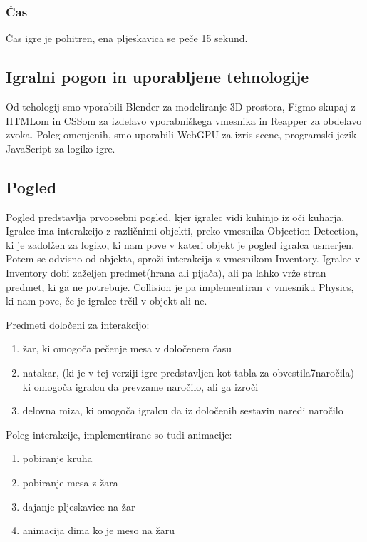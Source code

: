 \documentclass[a4paper]{article}
\begin{document}
\subsubsection{Čas}
Čas igre je pohitren, ena pljeskavica se peče 15 sekund.

\subsection{Igralni pogon in uporabljene tehnologije}
Od tehologij smo vporabili Blender za modeliranje 3D prostora, Figmo skupaj z HTMLom in CSSom za izdelavo vporabniškega vmesnika in Reapper za obdelavo zvoka.
Poleg omenjenih, smo uporabili WebGPU za izris scene, programski jezik JavaScript za logiko igre.

\subsection{Pogled}
Pogled predstavlja prvoosebni pogled, kjer igralec vidi kuhinjo iz oči kuharja. Igralec ima interakcijo z različnimi objekti, preko vmesnika Objection Detection, ki je zadolžen za logiko, ki nam pove v kateri objekt je pogled igralca usmerjen.
Potem se odvisno od objekta, sproži interakcija z vmesnikom Inventory. Igralec v Inventory dobi zaželjen predmet(hrana ali pijača), ali pa lahko vrže stran predmet, ki ga ne potrebuje.
Collision je pa implementiran v vmesniku Physics, ki nam pove, če je igralec trčil v objekt ali ne.

Predmeti določeni za interakcijo: 
\begin{enumerate}
\item žar, ki omogoča pečenje mesa v določenem času
\item natakar, (ki je v tej verziji igre predstavljen kot tabla za obvestila7naročila) ki omogoča igralcu da prevzame naročilo, ali ga izroči
\item delovna miza, ki omogoča igralcu da iz določenih sestavin naredi naročilo
\end{enumerate}

Poleg interakcije, implementirane so tudi animacije:
\begin{enumerate}
\item pobiranje kruha
\item pobiranje mesa z žara 
\item dajanje pljeskavice na žar
\item animacija dima ko je meso na žaru
\end{enumerate}
\end{document}
